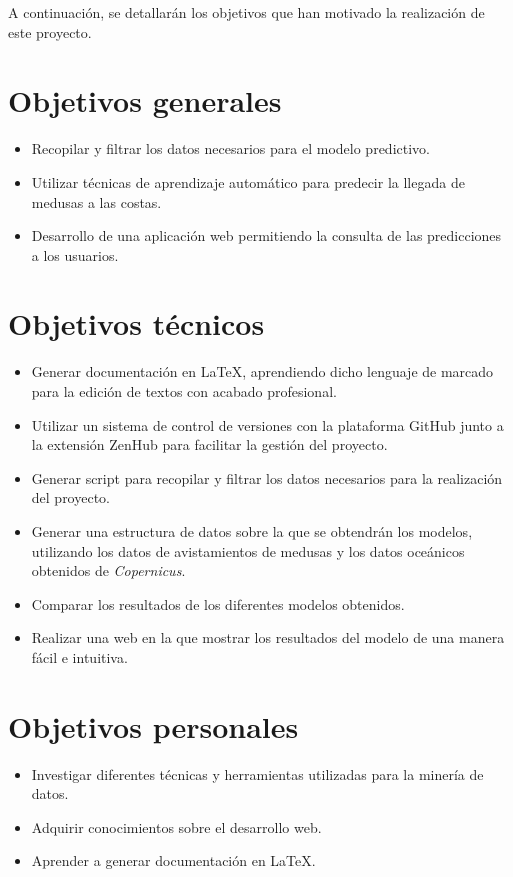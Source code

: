 

A continuación, se detallarán los objetivos que han motivado la realización de este proyecto.

\section{Objetivos generales}
\begin{itemize}
	
	\item Recopilar y filtrar los datos necesarios para el modelo predictivo.
	\item Utilizar técnicas de aprendizaje automático para predecir la llegada de medusas a las costas.
	\item Desarrollo de una aplicación web permitiendo la consulta de las predicciones a los usuarios.
\end{itemize}

\section{Objetivos técnicos}
\begin{itemize}
	\item Generar documentación en \LaTeX, aprendiendo dicho lenguaje de marcado para la edición de textos con acabado profesional.
	\item Utilizar un sistema de control de versiones con la plataforma GitHub junto a la extensión ZenHub para facilitar la gestión del proyecto.
	\item Generar script para recopilar y filtrar los datos necesarios para la realización del proyecto.
	\item Generar una estructura de datos sobre la que se obtendrán los modelos, utilizando los datos de avistamientos de medusas y los datos oceánicos obtenidos de \emph{Copernicus}.
	\item Comparar los resultados de los diferentes modelos obtenidos.	
	\item Realizar una web en la que mostrar los resultados del modelo de una manera fácil e intuitiva.
\end{itemize}

\section{Objetivos personales}
\begin{itemize}
	\item Investigar diferentes técnicas y herramientas utilizadas para la minería de datos.
	\item Adquirir conocimientos sobre el desarrollo web.
	\item Aprender a generar documentación en \LaTeX.
	
\end{itemize}
